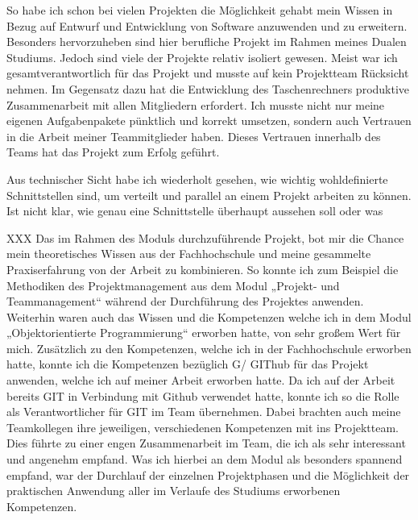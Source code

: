 So habe ich schon bei vielen Projekten die Möglichkeit gehabt mein Wissen in Bezug auf Entwurf und Entwicklung von Software anzuwenden und zu erweitern. Besonders hervorzuheben sind hier berufliche Projekt im Rahmen meines Dualen Studiums. Jedoch sind viele der Projekte relativ isoliert gewesen. Meist war ich gesamtverantwortlich für das Projekt und musste auf kein Projektteam Rücksicht nehmen. Im Gegensatz dazu hat die Entwicklung des Taschenrechners produktive Zusammenarbeit mit allen Mitgliedern erfordert. Ich musste nicht nur meine eigenen Aufgabenpakete pünktlich und korrekt umsetzen, sondern auch Vertrauen in die Arbeit meiner Teammitglieder haben. Dieses Vertrauen innerhalb des Teams hat das Projekt zum Erfolg geführt.

Aus technischer Sicht habe ich wiederholt gesehen, wie wichtig wohldefinierte Schnittstellen sind, um verteilt und parallel an einem Projekt arbeiten zu können. Ist nicht klar, wie genau eine Schnittstelle überhaupt aussehen soll oder was 

XXX
Das im Rahmen des Moduls durchzuführende Projekt, bot mir die Chance mein theoretisches Wissen aus der Fachhochschule und meine gesammelte Praxiserfahrung von der Arbeit zu kombinieren. So konnte ich zum Beispiel die Methodiken des Projektmanagement aus dem Modul „Projekt- und Teammanagement“ während der Durchführung des Projektes anwenden. Weiterhin waren auch das Wissen und die Kompetenzen welche ich in dem Modul „Objektorientierte Programmierung“ erworben hatte, von sehr großem Wert für mich. Zusätzlich zu den Kompetenzen, welche ich in der Fachhochschule erworben hatte, konnte ich die Kompetenzen bezüglich G/ GIThub für das Projekt anwenden, welche ich auf meiner Arbeit erworben hatte. Da ich auf der Arbeit bereits GIT in Verbindung mit Github verwendet hatte, konnte ich so die Rolle als Verantwortlicher für GIT im Team übernehmen. Dabei brachten auch meine Teamkollegen ihre jeweiligen, verschiedenen Kompetenzen mit ins Projektteam. Dies führte zu einer engen Zusammenarbeit im Team, die ich als sehr interessant und angenehm empfand. Was ich hierbei an dem Modul als besonders spannend empfand, war der Durchlauf der einzelnen Projektphasen und die Möglichkeit der praktischen Anwendung aller im Verlaufe des Studiums erworbenen Kompetenzen.
